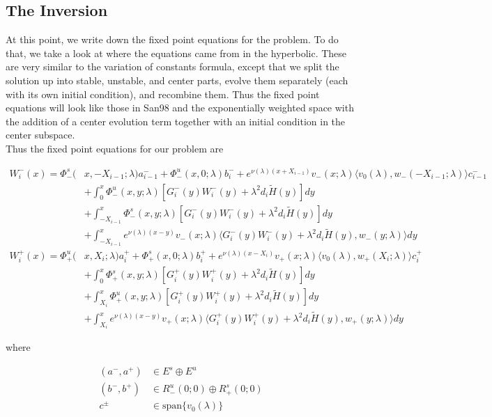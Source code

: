 \documentclass[12pt]{article}
\begin{document}
\subsection{The Inversion}

At this point, we write down the fixed point equations for the problem. To do that, we take a look at where the equations came from in the hyperbolic. These are very similar to the variation of constants formula, except that we split the solution up into stable, unstable, and center parts, evolve them separately (each with its own initial condition), and recombine them. Thus the fixed point equations will look like those in San98 and the exponentially weighted space with the addition of a center evolution term together with an initial condition in the center subspace.\\ 

Thus the fixed point equations for our problem are

\begin{align*}
W_i^-(x) = \Phi^s_-(&x, -X_{i-1}; \lambda)a_{i-1}^- + \Phi^u_-(x, 0; \lambda)b_i^- + e^{\nu(\lambda)(x+X_{i-1})} v_-(x; \lambda) \langle v_0(\lambda), w_-(-X_{i-1}; \lambda) \rangle c_{i-1}^- \\
&+ \int_0^x \Phi^u_-(x, y; \lambda)[ G_i^-(y)W_i^-(y) + \lambda^2 d_i \tilde{H}(y) ] dy \\
&+ \int_{-X_{i-1}}^x \Phi^s_-(x, y; \lambda) [ G_i^-(y)W_i^-(y) + \lambda^2 d_i \tilde{H}(y) ] dy \\
&+ \int_{-X_{i-1}}^x 
e^{\nu(\lambda)(x-y)} v_-(x; \lambda) \langle G_i^-(y)W_i^-(y) + \lambda^2 d_i \tilde{H}(y), w_-(y; \lambda) \rangle dy \\
W_i^+(x) = \Phi^u_+(&x, X_i; \lambda)a_i^+ + \Phi^s_+(x, 0; \lambda)b_i^+ + e^{\nu(\lambda)(x - X_i)} v_+(x; \lambda) \langle v_0(\lambda), w_+(X_i; \lambda) \rangle c_i^+ \\
&+ \int_0^x \Phi^s_+(x, y; \lambda) [ G_i^+(y)W_i^+(y) + \lambda^2 d_i \tilde{H}(y) ] dy \\
&+ \int_{X_i}^x \Phi^u_+(x, y; \lambda) [ G_i^+(y)W_i^+(y) + \lambda^2 d_i \tilde{H}(y) ] dy \\
&+ \int_{X_i}^x e^{\nu(\lambda)(x-y)} v_+(x; \lambda) \langle G_i^+(y)W_i^+(y) + \lambda^2 d_i \tilde{H}(y), w_+(y; \lambda) \rangle dy
\end{align*}

where

\begin{align*}
(a^-, a^+) &\in E^s \oplus E^u\\
(b^-, b^+) &\in R^u_-(0; 0) \oplus R^s_+(0; 0)\\
c^\pm &\in \text{span}\{v_0(\lambda)\}
\end{align*}
\end{document}
